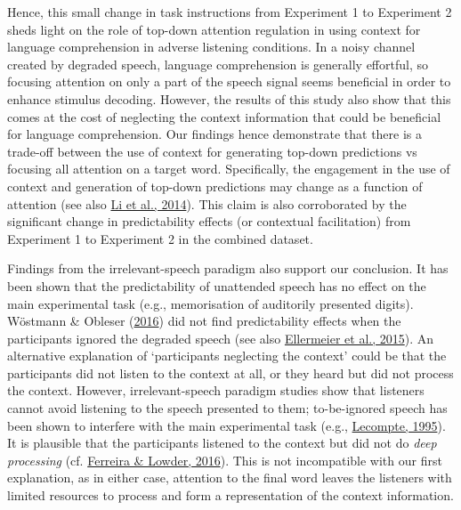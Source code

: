 \documentclass[a4paper, nobind]{templates/ociamthesis}
\begin{document}
Hence, this small change in task instructions from Experiment 1 to Experiment 2 sheds light on the role of top-down attention regulation in using context for language comprehension in adverse listening conditions.
In a noisy channel created by degraded speech, language comprehension is generally effortful, so focusing attention on only a part of the speech signal seems beneficial in order to enhance stimulus decoding.
However, the results of this study also show that this comes at the cost of neglecting the context information that could be beneficial for language comprehension.
Our findings hence demonstrate that there is a trade-off between the use of context for generating top-down predictions vs focusing all attention on a target word.
Specifically, the engagement in the use of context and generation of top-down predictions may change as a function of attention (see also \protect\hyperlink{ref-Li2014}{Li et al., 2014}).
This claim is also corroborated by the significant change in predictability effects (or contextual facilitation) from Experiment 1 to Experiment 2 in the combined dataset.

Findings from the irrelevant-speech paradigm also support our conclusion.
It has been shown that the predictability of unattended speech has no effect on the main experimental task (e.g., memorisation of auditorily presented digits).
Wöstmann \& Obleser (\protect\hyperlink{ref-Wostmann2016}{2016}) did not find predictability effects when the participants ignored the degraded speech (see also \protect\hyperlink{ref-Ellermeier2015}{Ellermeier et al., 2015}).
An alternative explanation of `participants neglecting the context' could be that the participants did not listen to the context at all,
or they heard but did not process the context.
However, irrelevant-speech paradigm studies show that listeners cannot avoid listening to the speech presented to them;
to-be-ignored speech has been shown to interfere with the main experimental task (e.g., \protect\hyperlink{ref-LeCompte1995}{Lecompte, 1995}).
It is plausible that the participants listened to the context but did not do \emph{deep processing} (cf. \protect\hyperlink{ref-Ferreira2016}{Ferreira \& Lowder, 2016}).
This is not incompatible with our first explanation, as in either case, attention to the final word leaves the listeners with limited resources to process and form a representation of the context information.
\end{document}
